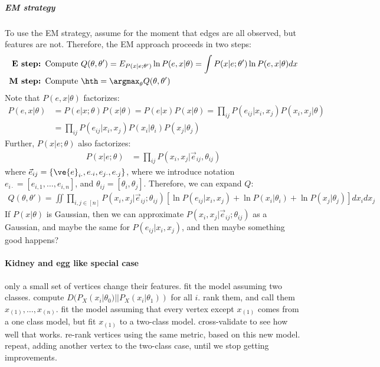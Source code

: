 \documentclass{article}
\begin{document}
\subparagraph{EM strategy}

To use the EM strategy, assume for the moment that edges are all observed, but features are not.  Therefore, the EM approach proceeds in two steps:
\begin{align*}
\textbf{E step: } \text{Compute } & Q(\theta,\theta') = E_{P(x | e; \theta')} \ln P(e,x | \theta) = \int P(x | e; \theta') \ln P(e,x | \theta) dx\\
\textbf{M step: } \text{Compute }& \hth = \argmax_{\theta} Q(\theta,\theta')
\end{align*}
Note that $P(e,x|\theta)$ factorizes:
\begin{align}
	P(e,x|\theta) &= P(e | x; \theta) P(x | \theta) = P(e|x) P(x|\theta) = \prod_{ij} P(e_{ij} | x_i,x_j) P(x_i, x_j | \theta) \nonumber \\ 
	&=  \prod_{ij} P(e_{ij} | x_i,x_j) P(x_i| \theta_i) P(x_j | \theta_j)
\end{align}
Further, $P(x|e;\theta)$ also factorizes:
\begin{align}
	P(x|e;\theta) &= \prod_{ij} P(x_i, x_j | \vec{e}_{ij}, \theta_{ij} )
\end{align}
where $\vec{e}_{ij}=\{\ve{e}_{i\cdot}, e_{\cdot i}, e_{j\cdot}, e_{\cdot j}\}$, where we introduce notation $e_{i\cdot}=[e_{i,1}, \ldots, e_{i,n}]$, and $\theta_{ij}=[\theta_i,\theta_j]$.  Therefore, we can expand $Q$:
\begin{align}
	Q(\theta,\theta') = \iint \prod_{i,j \in [n]} P(x_i,x_j | \vec{e}_{ij}; \theta_{ij}) [\ln P(e_{ij}| x_i, x_j) + \ln P(x_i | \theta_i) + \ln P(x_j | \theta_j)] dx_i dx_j
\end{align}
If $P(x|\theta)$ is Gaussian, then we can approximate $P(x_i,x_j | \vec{e}_{ij}; \theta_{ij})$ as a Gaussian, and maybe the same for $P(e_{ij} | x_i,x_j)$, and then maybe something good happens?



\paragraph{Kidney and egg like special case}

only a small set of vertices change their features.  fit the model assuming two classes.  compute  $D(P_X(x_i | \theta_0) || P_X(x_i | \theta_1))$ for all $i$.  rank them, and call them $x_{(1)}, \ldots, x_{(n)}$.  fit the model assuming that every vertex except $x_{(1)}$ comes from a one class model, but fit $x_{(1)}$ to a two-class model.  cross-validate to see how well that works.  re-rank vertices using the same metric, based on this new model.  repeat, adding another vertex to the two-class case, until we stop getting improvements.
\end{document}
